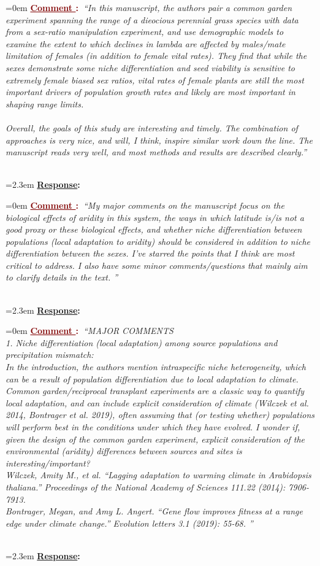 \documentclass[12pt]{article}
\newcounter{cN}
\newcommand{\comment}[1]{
	\vspace{2em}
	\refstepcounter{cN} %
	\noindent \hangindent=0em \textbf{\textcolor{Maroon}{\uline{Comment \thecN}:~}}\emph{``#1''}
	}
\newcommand{\response}[1]{
	\\[0.25em]
	\hangindent=2.3em \textbf{\textcolor{NavyBlue}{\uline{Response}:~}}#1
	}
\begin{document}
\comment{In this manuscript, the authors pair a common garden experiment spanning the range of a dieocious perennial grass species with data from a sex-ratio manipulation experiment, and use demographic models to examine the extent to which declines in lambda are affected by males/mate limitation of females (in addition to female vital rates). They find that while the sexes demonstrate some niche differentiation and seed viability is sensitive to extremely female biased sex ratios, vital rates of female plants are still the most important drivers of population growth rates and likely are most important in shaping range limits.
\\
\\	
Overall, the goals of this study are interesting and timely. The combination of approaches is very nice, and will, I think, inspire similar work down the line. The manuscript reads very well, and most methods and results are described clearly.}
\response{}
	
\comment{My major comments on the manuscript focus on the biological effects of aridity in this system, the ways in which latitude is/is not a good proxy or these biological effects, and whether niche differentiation between populations (local adaptation to aridity) should be considered in addition to niche differentiation between the sexes. I've starred the points that I think are most critical to address. I also have some minor comments/questions that mainly aim to clarify details in the text.
}
\response{}

\comment{MAJOR COMMENTS
	\\
	1. Niche differentiation (local adaptation) among source populations and precipitation mismatch:
	\\
	In the introduction, the authors mention intraspecific niche heterogeneity, which can be a result of population differentiation due to local adaptation to climate. Common garden/reciprocal transplant experiments are a classic way to quantify local adaptation, and can include explicit consideration of climate (Wilczek et al. 2014, Bontrager et al. 2019), often assuming that (or testing whether) populations will perform best in the conditions under which they have evolved. I wonder if, given the design of the common garden experiment, explicit consideration of the environmental (aridity) differences between sources and sites is interesting/important?
	\\
	Wilczek, Amity M., et al. ``Lagging adaptation to warming climate in Arabidopsis thaliana.'' Proceedings of the National Academy of Sciences 111.22 (2014): 7906-7913.
	\\
	Bontrager, Megan, and Amy L. Angert. ``Gene flow improves fitness at a range edge under climate change.'' Evolution letters 3.1 (2019): 55-68.
}
\response{}
\end{document}
